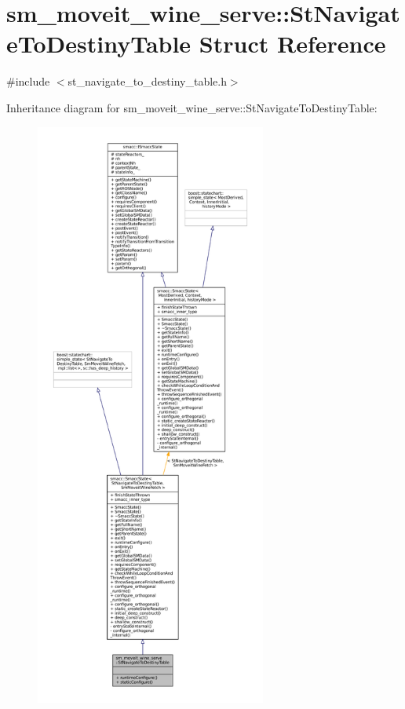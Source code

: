 \hypertarget{structsm__moveit__wine__serve_1_1StNavigateToDestinyTable}{}\section{sm\+\_\+moveit\+\_\+wine\+\_\+serve\+:\+:St\+Navigate\+To\+Destiny\+Table Struct Reference}
\label{structsm__moveit__wine__serve_1_1StNavigateToDestinyTable}


{\ttfamily \#include $<$st\+\_\+navigate\+\_\+to\+\_\+destiny\+\_\+table.\+h$>$}



Inheritance diagram for sm\+\_\+moveit\+\_\+wine\+\_\+serve\+:\+:St\+Navigate\+To\+Destiny\+Table\+:
\nopagebreak
\begin{figure}[H]
\begin{center}
\leavevmode
\includegraphics[height=550pt]{structsm__moveit__wine__serve_1_1StNavigateToDestinyTable__inherit__graph}
\end{center}
\end{figure}



